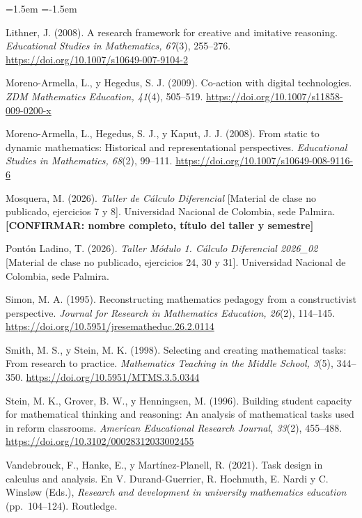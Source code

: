 \documentclass[11pt,letterpaper]{article}
\begin{document}
\begin{list}{}{\leftmargin=1.5em \itemindent=-1.5em \itemsep=3pt \parsep=0pt}
\item Lithner, J. (2008). A research framework for creative and imitative reasoning. \emph{Educational Studies in Mathematics, 67}(3), 255--276. \url{https://doi.org/10.1007/s10649-007-9104-2}
\item Moreno-Armella, L., y Hegedus, S. J. (2009). Co-action with digital technologies. \emph{ZDM Mathematics Education, 41}(4), 505--519. \url{https://doi.org/10.1007/s11858-009-0200-x}
\item Moreno-Armella, L., Hegedus, S. J., y Kaput, J. J. (2008). From static to dynamic mathematics: Historical and representational perspectives. \emph{Educational Studies in Mathematics, 68}(2), 99--111. \url{https://doi.org/10.1007/s10649-008-9116-6}
\item Mosquera, M. (2026). \emph{Taller de Cálculo Diferencial} [Material de clase no publicado, ejercicios 7 y 8]. Universidad Nacional de Colombia, sede Palmira. \textbf{[CONFIRMAR: nombre completo, título del taller y semestre]}
\item Pontón Ladino, T. (2026). \emph{Taller Módulo 1. Cálculo Diferencial 2026\_02} [Material de clase no publicado, ejercicios 24, 30 y 31]. Universidad Nacional de Colombia, sede Palmira.
\item Simon, M. A. (1995). Reconstructing mathematics pedagogy from a constructivist perspective. \emph{Journal for Research in Mathematics Education, 26}(2), 114--145. \url{https://doi.org/10.5951/jresematheduc.26.2.0114}
\item Smith, M. S., y Stein, M. K. (1998). Selecting and creating mathematical tasks: From research to practice. \emph{Mathematics Teaching in the Middle School, 3}(5), 344--350. \url{https://doi.org/10.5951/MTMS.3.5.0344}
\item Stein, M. K., Grover, B. W., y Henningsen, M. (1996). Building student capacity for mathematical thinking and reasoning: An analysis of mathematical tasks used in reform classrooms. \emph{American Educational Research Journal, 33}(2), 455--488. \url{https://doi.org/10.3102/00028312033002455}
\item Vandebrouck, F., Hanke, E., y Martínez-Planell, R. (2021). Task design in calculus and analysis. En V. Durand-Guerrier, R. Hochmuth, E. Nardi y C. Winsløw (Eds.), \emph{Research and development in university mathematics education} (pp.~104--124). Routledge.
\end{list}
\end{document}
